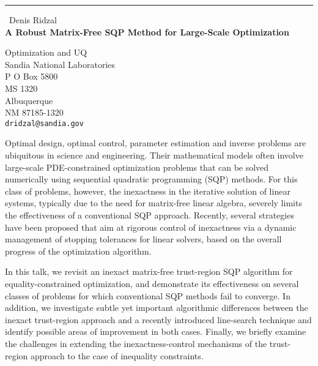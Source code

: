 \documentclass{report}
\begin{document}
\begin{center}
\rule{6in}{1pt} \
{\large Denis Ridzal \\
{\bf A Robust Matrix-Free SQP Method for Large-Scale Optimization}}

Optimization and UQ \\ Sandia National Laboratories \\ P O Box 5800 \\ MS 1320 \\ Albuquerque \\ NM 87185-1320
\\
{\tt dridzal@sandia.gov}\end{center}

Optimal design, optimal control, parameter estimation and inverse
problems are ubiquitous in science and engineering. Their mathematical
models often involve large-scale PDE-constrained optimization problems
that can be solved numerically using sequential quadratic programming
(SQP) methods. For this class of problems, however, the inexactness in
the iterative solution of linear systems, typically due to the need for
matrix-free linear algebra, severely limits the effectiveness of a
conventional SQP approach. Recently, several strategies have been
proposed that aim at rigorous control of inexactness via a dynamic
management of stopping tolerances for linear solvers, based on the
overall progress of the optimization algorithm.

In this talk, we revisit an inexact matrix-free trust-region SQP
algorithm for equality-constrained optimization, and demonstrate its
effectiveness on several classes of problems for which conventional SQP
methods fail to converge. In addition, we investigate subtle yet
important algorithmic differences between the inexact trust-region
approach and a recently introduced line-search technique and identify
possible areas of improvement in both cases. Finally, we briefly examine
the challenges in extending the inexactness-control mechanisms of the
trust-region approach to the case of inequality constraints.
\end{document}
